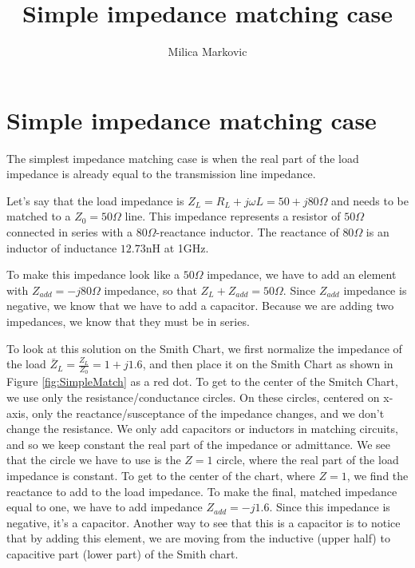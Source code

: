 \documentclass{ximera}
\title{Simple impedance matching case}
\author{Milica Markovic}
\begin{document}
  
\begin{abstract}  

\end{abstract}  
\maketitle    


\section{Simple impedance matching case}

The simplest impedance matching case is when the real part of the load impedance is already equal to the transmission line impedance. 

Let's say that the load impedance is $Z_L=R_L+j \omega L =50+j80 \Omega$ and needs to be matched to a $Z_0=50\Omega$ line. This impedance represents a resistor of $50\Omega$ connected in series with a $80 \Omega$-reactance inductor. The reactance of $80 \Omega$ is an inductor of inductance $12.73$nH at 1GHz.  

To make this impedance look like a $50 \Omega$ impedance, we have to add an element   with $Z_{add}=-j80 \Omega $ impedance, so that $Z_L+Z_{add}=50 \Omega$. Since $Z_{add}$ impedance is negative, we know that we have to add a capacitor. Because we are adding two impedances, we know that they must be in series. 

To look at this solution on the Smith Chart, we first normalize the impedance of the load $\bar{Z}_L=\frac{Z_L}{Z_0}=1+j1.6$, and then place it on the Smith Chart as shown in Figure \ref{fig:SimpleMatch} as a red dot. To get to the center of the Smitch Chart, we use only the resistance/conductance circles. On these circles, centered on x-axis, only the reactance/susceptance of the impedance changes, and we don't change the resistance.  We only add capacitors or inductors in matching circuits, and so we keep constant the real part of the impedance or admittance. We see that the circle we have to use is the $Z=1$ circle, where the real part of the load impedance is constant.  To get to the center of the chart, where $Z=1$, we find the reactance  to add to the load impedance. To make the final, matched impedance equal to one, we have to add impedance $Z_{add}=-j1.6$. Since this impedance is negative, it's a capacitor. Another way to see that this is a capacitor is to notice that by adding this element, we are moving from the inductive (upper half) to capacitive part (lower part) of the Smith chart. 
\end{document}
